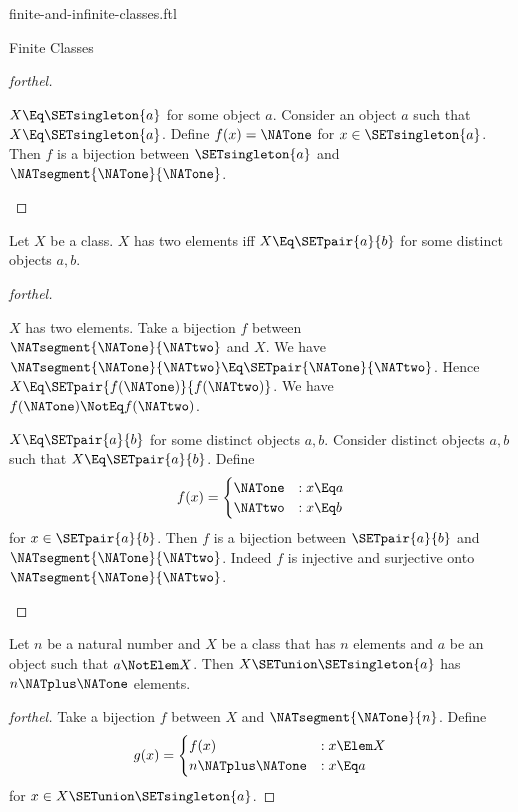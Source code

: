 \documentclass{stex}
\begin{document}
\begin{smodule}{finite-and-infinite-classes.ftl}
\begin{sfragment}{Finite Classes}
\begin{proof}[forthel]
    \begin{case}{$X \Eq \SETsingleton{a}$ for some object $a$.}
      Consider an object $a$ such that $X \Eq \SETsingleton{a}$.
      Define $f(x) = \NATone$ for $x \in \SETsingleton{a}$.
      Then $f$ is a bijection between $\SETsingleton{a}$ and $\NATsegment{\NATone}{\NATone}$.
    \end{case}
  \end{proof}

  \begin{proposition}[forthel,id=FOUNDATIONS_14_3468912675458910]
    Let $X$ be a class.
    $X$ has two elements iff $X \Eq \SETpair{a}{b}$ for some distinct objects $a, b$.
  \end{proposition}
  \begin{proof}[forthel]
    \begin{case}{$X$ has two elements.}
      Take a bijection $f$ between $\NATsegment{\NATone}{\NATtwo}$ and $X$.
      We have $\NATsegment{\NATone}{\NATtwo} \Eq \SETpair{\NATone}{\NATtwo}$.
      Hence $X \Eq \SETpair{f(\NATone)}{f(\NATtwo)}$.
      We have $f(\NATone) \NotEq f(\NATtwo)$.
    \end{case}

    \begin{case}{$X \Eq \SETpair{a}{b}$ for some distinct objects $a, b$.}
      Consider distinct objects $a, b$ such that $X \Eq \SETpair{a}{b}$.
      Define \[f(x) =
        \begin{cases}
          \NATone & : x \Eq a \\
          \NATtwo & : x \Eq b
        \end{cases}\]
      for $x \in \SETpair{a}{b}$.
      Then $f$ is a bijection between $\SETpair{a}{b}$ and $\NATsegment{\NATone}{\NATtwo}$.
      Indeed $f$ is injective and surjective onto $\NATsegment{\NATone}{\NATtwo}$.
    \end{case}
  \end{proof}

  \begin{proposition}[forthel,id=FOUNDATIONS_14_0615204230800975]
    Let $n$ be a natural number and $X$ be a class that has $n$ elements and $a$ be an object such that $a \NotElem X$.
    Then $X \SETunion \SETsingleton{a}$ has $n \NATplus \NATone$ elements.
  \end{proposition}
  \begin{proof}[forthel]
    Take a bijection $f$ between $X$ and $\NATsegment{\NATone}{n}$.
    Define \[g(x) =
      \begin{cases}
        f(x)  & : x \Elem X \\
        n \NATplus \NATone & : x \Eq a
      \end{cases}\]
    for $x \in X \SETunion \SETsingleton{a}$.


\end{proof}
\end{sfragment}
\end{smodule}
\end{document}
